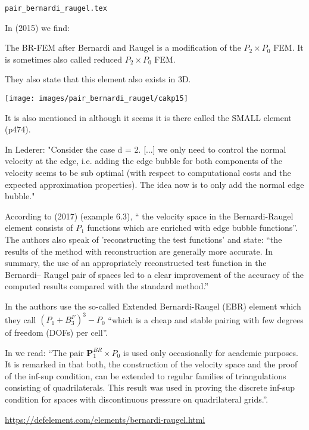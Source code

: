 \begin{flushright} {\tiny {\color{gray} \tt pair\_bernardi\_raugel.tex}} \end{flushright}

In \textcite{cakp15} (2015) we find: 
\begin{displayquote}
{\color{darkgray}
The BR-FEM after Bernardi and Raugel \cite{bera85} 
is a modification of the $P_2\times P_0$ FEM. 
It is sometimes also called reduced $P_2\times P_0$ FEM.}
\end{displayquote}
They also state that this element also exists in 3D.

\begin{center}
\texttt{[image: images/pair\_bernardi\_raugel/cakp15]}
\end{center}

It is also mentioned in \textcite{bobf13} although it seems it is there called the SMALL element (p474).

In Lederer: "Consider the case d = 2. [...] we only need to control 
the normal velocity at the edge, i.e. adding the
edge bubble for both components of the velocity seems to be sub optimal (with respect to
computational costs and the expected approximation properties). The idea now is to only
add the normal edge bubble."

According to \textcite{jolm17} (2017) (example 6.3), `` the velocity space in the Bernardi-Raugel
element consists of $P_1$ functions which are enriched with edge bubble functions''.
The authors also speak of 'reconstructing the test functions' and state: 
``the results of the method with reconstruction are generally more accurate.
In summary, the use of an appropriately reconstructed test function in the Bernardi–
Raugel pair of spaces led to a clear improvement of the accuracy of the computed
results compared with the standard method.''

In \cite{befh21} the authors use the so-called Extended Bernardi-Raugel (EBR) element
which they call $(P_1 + B_3^F)^3 - P_0$ ``which is a cheap and stable pairing with few degrees of
freedom (DOFs) per cell''.

In \textcite{john16} we read: {\color{darkgray} ``The pair 
${\bm P}_1^{BR} \times P_0$ is used only occasionally for academic purposes.
It is remarked in \textcite{bera85} that both, the construction of the velocity
space and the proof of the inf-sup condition, can be extended to regular families
of triangulations consisting of quadrilaterals. This result was used in proving the
discrete inf-sup condition for spaces with discontinuous pressure on quadrilateral
grids.''}.

\url{https://defelement.com/elements/bernardi-raugel.html}


